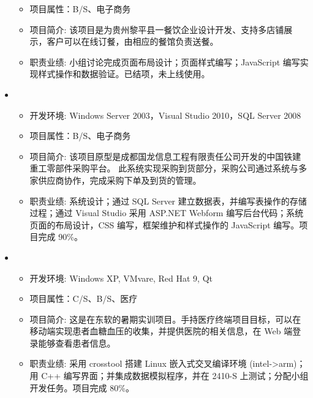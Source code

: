 \begin{itemize}[leftmargin=*]
{\begin{itemize}
      \item 项目属性：B/S、电子商务
      \item 项目简介: 该项目是为贵州黎平县一餐饮企业设计开发、支持多店铺展示，客户可以在线订餐，由相应的餐馆负责送餐。
      \item 职责业绩: 小组讨论完成页面布局设计；页面样式编写；JavaScript 编写实现样式操作和数据验证。已结项，未上线使用。
    \end{itemize}
    }
    \item
    {\small
    \begin{itemize}
      \item 开发环境: Windows Server 2003，Visual Studio 2010，SQL Server 2008
      \item 项目属性：B/S、电子商务
      \item 项目简介: 该项目原型是成都国龙信息工程有限责任公司开发的中国铁建重工零部件采购平台。 此系统实现采购到货部分，采购公司通过系统与多家供应商协作，完成采购下单及到货的管理。
      \item 职责业绩: 系统设计；通过 SQL Server 建立数据表，并编写表操作的存储过程；通过 Visual Studio 采用 ASP.NET Webform 编写后台代码；系统页面的布局设计，CSS 编写，框架维护和样式操作的 JavaScript 编写。项目完成 90\%。
    \end{itemize}
    }
    \item {}
    {\small
    \begin{itemize}
      \item 开发环境: Windows XP, VMvare, Red Hat 9, Qt
      \item 项目属性：C/S、B/S、医疗
      \item 项目简介: 这是在东软的暑期实训项目。手持医疗终端项目目标，可以在移动端实现患者血糖血压的收集，并提供医院的相关信息，在 Web 端登录能够查看患者信息。
      \item 职责业绩: 采用 crosstool 搭建 Linux 嵌入式交叉编译环境 (intel->arm)；用 C++ 编写界面；并集成数据模拟程序，并在 2410-S 上测试；分配小组开发任务。项目完成 80\%。
    \end{itemize}
    }
  \end{itemize}